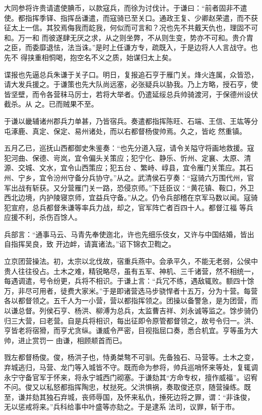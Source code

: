 \documentclass{article}
\begin{document}
大同参将许贵请遣使腆币，以款寇兵，而徐为讨伐计。于谦曰：“前者固非不遣使。都指挥季铎、指挥岳谦遣，而寇骑已至关口。通政王复、少卿赵荣遣，而不获征太上一信。其狡焉侮我而龁我，何似而可言和？况也先不共戴天仇也，理固不可和。万一和
\newpage
而彼遂肆无厌之求，从之则坐弊，不从则生变，势亦不可和。贵介胄之臣，而委靡退怯，法当诛。”是时上任谦方专，疏既入，于是边将人人言战守。也先不
得挟重相恫喝，抱空名不义之质，始谋归太上矣。 

谍报也先逼总兵朱谦于关子口。明日，复报追石亨于雁门关。烽火连属，众皆恐，请大发兵援之。于谦策也先大队尚远塞，必张疑兵以胁我。乃上方略，授石亨，使皆坚壁，而令各营秣马厉士，若将大举者。仍遣延绥总兵帅骑渡河，于保德州设伏截杀。从
之。已而贼果不至。 

于谦以畿辅诸州郡兵力单甚，乃皆宿兵。奏遣都指挥陈旺、石端、王信、王竑等分屯涿鹿、真定、保定、易州诸处，而以右都督杨俊帅焉。久之，皆屹
然重镇。 

五月乙已，巡抚山西都御史朱鉴奏：“也先分道入寇，请令关隘守将画地救援。寇犯河曲、保德、岢岚，宜令偏头关策应；犯宁化、静乐、忻州、定襄、太原、清源、交城、文水，宜令山西策应；犯五台
\newpage
、繁峙、崞县，宜令雁门关策应。其石州、宁乡，宜令汾州守备分兵协守。”从之。武清侯石亨奏：“寇骑六万围代州，官军出战有斩获。又分营雁门关一路，恐侵京师。”下廷臣议：“黄花镇、鞍口，外卫西北边境，内护陵寝京师，宜益兵守备。”从之。仍令兵部稽在京军马数以闻。寇骑犯宣府，总兵都督朱谦等率兵力战，却之，官军阵亡者百四十人。都督江福
等兵应援不利，杀伤百馀人。 

兵部言：“通事马云、马青先奉使迤北，许也先细乐伎女，又许与中国结婚，皆出自指挥吴良，致
开边衅，请寘诸法。”诏下锦衣卫鞫之。 

立京团营操法。初，太宗以北伐故，宿重兵燕中。会承平久，不能无老弱，公侯中贵人往往役占。土木之难，精锐略尽，虽有五军、神机、三千诸营，然不相统一，每遇调遣，号令纷更，兵将不相识。于谦上言：“兵冗不练，遇敌辄败。额四十馀万，非尽可用者，徒费大家米。”于是即诸营选马步骁悍者十五万，分为十营。每营各以都督领之。五千人为一小营，营以都指挥领之。团操以备警急，是为团营，而
\newpage
以谦总督。列侯石亨、杨洪、柳溥为总兵，太监曹吉祥、刘永诚等监之。馀步骑仍归三大营，曰老营。自是兵将相识，每出征即令原管都督领之，故号令归一。洪、亨皆老将宿猾，而亨尤贪纵。谦威令严密，目视指屈口奏，悉合机宜。亨等虽为大帅，进止赏罚一
由谦，相顾𫖯首而已。 

戮左都督杨俊。俊，杨洪子也，恃勇桀骜不可驯。先备独石、马营等。土木之变，弃城逃归，马营、龙门等入城皆不守。既而命为参将，帅兵巡哨怀来等处，复辄调永宁守备官军于怀来，将永宁城西门砌塞。于谦劾其“方命专权，擅作威福”。诏宥不问。俊又以私怒都指挥陶忠，杖挞死。父洪惧祸，奏取俊还京，随营操练。既至，谦并劾其独石弃城，丧师辱国，及怀来私仇，捶死边将之罪，谓：“非诛俊，无以惩戒将来。”兵科给事中叶盛等亦劾之。于是逮系
法司，议罪，斩于市。 
\end{document}
